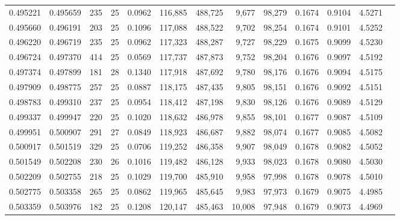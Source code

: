 \begin{tabular}{rrrrrrrrrrrrr}
0.495221 & 0.495659 &   235 &  25 &                                     0.0962 & 116,885 & 488,725 &   9,677 &  98,279 & 0.1674 & 0.9104 & 4.5271 \\
0.495660 & 0.496191 &   203 &  25 &                                     0.1096 & 117,088 & 488,522 &   9,702 &  98,254 & 0.1674 & 0.9101 & 4.5252 \\
0.496220 & 0.496719 &   235 &  25 &                                     0.0962 & 117,323 & 488,287 &   9,727 &  98,229 & 0.1675 & 0.9099 & 4.5230 \\
0.496724 & 0.497370 &   414 &  25 &                                     0.0569 & 117,737 & 487,873 &   9,752 &  98,204 & 0.1676 & 0.9097 & 4.5192 \\
0.497374 & 0.497899 &   181 &  28 &                                     0.1340 & 117,918 & 487,692 &   9,780 &  98,176 & 0.1676 & 0.9094 & 4.5175 \\
0.497909 & 0.498775 &   257 &  25 &                                     0.0887 & 118,175 & 487,435 &   9,805 &  98,151 & 0.1676 & 0.9092 & 4.5151 \\
0.498783 & 0.499310 &   237 &  25 &                                     0.0954 & 118,412 & 487,198 &   9,830 &  98,126 & 0.1676 & 0.9089 & 4.5129 \\
0.499337 & 0.499947 &   220 &  25 &                                     0.1020 & 118,632 & 486,978 &   9,855 &  98,101 & 0.1677 & 0.9087 & 4.5109 \\
0.499951 & 0.500907 &   291 &  27 &                                     0.0849 & 118,923 & 486,687 &   9,882 &  98,074 & 0.1677 & 0.9085 & 4.5082 \\
0.500917 & 0.501519 &   329 &  25 &                                     0.0706 & 119,252 & 486,358 &   9,907 &  98,049 & 0.1678 & 0.9082 & 4.5052 \\
0.501549 & 0.502208 &   230 &  26 &                                     0.1016 & 119,482 & 486,128 &   9,933 &  98,023 & 0.1678 & 0.9080 & 4.5030 \\
0.502209 & 0.502755 &   218 &  25 &                                     0.1029 & 119,700 & 485,910 &   9,958 &  97,998 & 0.1678 & 0.9078 & 4.5010 \\
0.502775 & 0.503358 &   265 &  25 &                                     0.0862 & 119,965 & 485,645 &   9,983 &  97,973 & 0.1679 & 0.9075 & 4.4985 \\
0.503359 & 0.503976 &   182 &  25 &                                     0.1208 & 120,147 & 485,463 &  10,008 &  97,948 & 0.1679 & 0.9073 & 4.4969 \\

\end{tabular}

